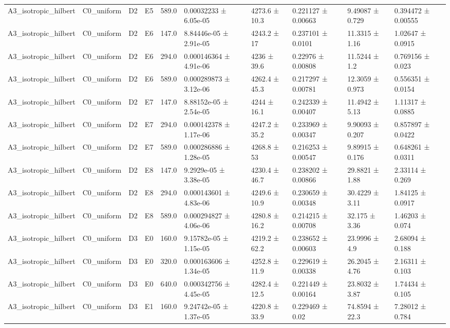 \begin{table}
\begin{tabular}{llllllllll}
A3\_isotropic\_hilbert & C0\_uniform & D2 & E5 & 589.0 & 0.00032233 ± 6.05e-05 & 4273.6 ± 10.3 & 0.221127 ± 0.00663 & 9.49087 ± 0.729 & 0.394472 ± 0.00555 \\
A3\_isotropic\_hilbert & C0\_uniform & D2 & E6 & 147.0 & 8.84446e-05 ± 2.91e-05 & 4243.2 ± 17 & 0.237101 ± 0.0101 & 11.3315 ± 1.16 & 1.02647 ± 0.0915 \\
A3\_isotropic\_hilbert & C0\_uniform & D2 & E6 & 294.0 & 0.000146364 ± 4.91e-06 & 4236 ± 39.6 & 0.22976 ± 0.00808 & 11.5244 ± 1.2 & 0.769156 ± 0.023 \\
A3\_isotropic\_hilbert & C0\_uniform & D2 & E6 & 589.0 & 0.000289873 ± 3.12e-06 & 4262.4 ± 45.3 & 0.217297 ± 0.00781 & 12.3059 ± 0.973 & 0.556351 ± 0.0154 \\
A3\_isotropic\_hilbert & C0\_uniform & D2 & E7 & 147.0 & 8.88152e-05 ± 2.54e-05 & 4244 ± 16.1 & 0.242339 ± 0.00407 & 11.4942 ± 5.13 & 1.11317 ± 0.0885 \\
A3\_isotropic\_hilbert & C0\_uniform & D2 & E7 & 294.0 & 0.000142378 ± 1.17e-06 & 4247.2 ± 35.2 & 0.233969 ± 0.00347 & 9.90093 ± 0.207 & 0.857897 ± 0.0422 \\
A3\_isotropic\_hilbert & C0\_uniform & D2 & E7 & 589.0 & 0.000286886 ± 1.28e-05 & 4268.8 ± 53 & 0.216253 ± 0.00547 & 9.89915 ± 0.176 & 0.648261 ± 0.0311 \\
A3\_isotropic\_hilbert & C0\_uniform & D2 & E8 & 147.0 & 9.2929e-05 ± 3.38e-05 & 4230.4 ± 46.7 & 0.238202 ± 0.00866 & 29.8821 ± 1.88 & 2.33114 ± 0.269 \\
A3\_isotropic\_hilbert & C0\_uniform & D2 & E8 & 294.0 & 0.000143601 ± 4.83e-06 & 4249.6 ± 10.9 & 0.230659 ± 0.00348 & 30.4229 ± 3.11 & 1.84125 ± 0.0917 \\
A3\_isotropic\_hilbert & C0\_uniform & D2 & E8 & 589.0 & 0.000294827 ± 4.06e-06 & 4280.8 ± 16.2 & 0.214215 ± 0.00708 & 32.175 ± 3.36 & 1.46203 ± 0.074 \\
A3\_isotropic\_hilbert & C0\_uniform & D3 & E0 & 160.0 & 9.15782e-05 ± 1.15e-05 & 4219.2 ± 62.2 & 0.238652 ± 0.00603 & 23.9996 ± 4.9 & 2.68094 ± 0.188 \\
A3\_isotropic\_hilbert & C0\_uniform & D3 & E0 & 320.0 & 0.000163606 ± 1.34e-05 & 4252.8 ± 11.9 & 0.229619 ± 0.00338 & 26.2045 ± 4.76 & 2.16311 ± 0.103 \\
A3\_isotropic\_hilbert & C0\_uniform & D3 & E0 & 640.0 & 0.000342756 ± 4.45e-05 & 4282.4 ± 12.5 & 0.221449 ± 0.00164 & 23.8032 ± 3.87 & 1.74434 ± 0.105 \\
A3\_isotropic\_hilbert & C0\_uniform & D3 & E1 & 160.0 & 9.24742e-05 ± 1.37e-05 & 4220.8 ± 33.9 & 0.229469 ± 0.02 & 74.8594 ± 22.3 & 7.28012 ± 0.784 \\

\end{tabular}
\end{table}
